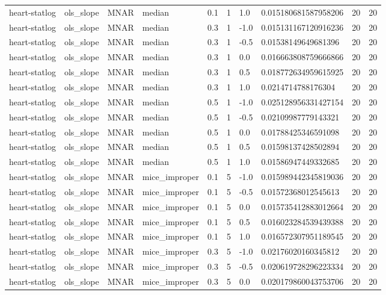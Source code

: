 \begin{tabular}{llllllllll}
heart-statlog & ols\_slope & MNAR & median & 0.1 & 1 & 1.0 & 0.015180681587958206 & 20 & 20 \\
heart-statlog & ols\_slope & MNAR & median & 0.3 & 1 & -1.0 & 0.015131167120916236 & 20 & 20 \\
heart-statlog & ols\_slope & MNAR & median & 0.3 & 1 & -0.5 & 0.01538149649681396 & 20 & 20 \\
heart-statlog & ols\_slope & MNAR & median & 0.3 & 1 & 0.0 & 0.016663808759666866 & 20 & 20 \\
heart-statlog & ols\_slope & MNAR & median & 0.3 & 1 & 0.5 & 0.018772634959615925 & 20 & 20 \\
heart-statlog & ols\_slope & MNAR & median & 0.3 & 1 & 1.0 & 0.0214714788176304 & 20 & 20 \\
heart-statlog & ols\_slope & MNAR & median & 0.5 & 1 & -1.0 & 0.025128956331427154 & 20 & 20 \\
heart-statlog & ols\_slope & MNAR & median & 0.5 & 1 & -0.5 & 0.02109987779143321 & 20 & 20 \\
heart-statlog & ols\_slope & MNAR & median & 0.5 & 1 & 0.0 & 0.01788425346591098 & 20 & 20 \\
heart-statlog & ols\_slope & MNAR & median & 0.5 & 1 & 0.5 & 0.01598137428502894 & 20 & 20 \\
heart-statlog & ols\_slope & MNAR & median & 0.5 & 1 & 1.0 & 0.01586947449332685 & 20 & 20 \\
heart-statlog & ols\_slope & MNAR & mice\_improper & 0.1 & 5 & -1.0 & 0.015989442345819036 & 20 & 20 \\
heart-statlog & ols\_slope & MNAR & mice\_improper & 0.1 & 5 & -0.5 & 0.01572368012545613 & 20 & 20 \\
heart-statlog & ols\_slope & MNAR & mice\_improper & 0.1 & 5 & 0.0 & 0.015735412883012664 & 20 & 20 \\
heart-statlog & ols\_slope & MNAR & mice\_improper & 0.1 & 5 & 0.5 & 0.016023284539439388 & 20 & 20 \\
heart-statlog & ols\_slope & MNAR & mice\_improper & 0.1 & 5 & 1.0 & 0.016572307951189545 & 20 & 20 \\
heart-statlog & ols\_slope & MNAR & mice\_improper & 0.3 & 5 & -1.0 & 0.02176020160345812 & 20 & 20 \\
heart-statlog & ols\_slope & MNAR & mice\_improper & 0.3 & 5 & -0.5 & 0.020619728296223334 & 20 & 20 \\
heart-statlog & ols\_slope & MNAR & mice\_improper & 0.3 & 5 & 0.0 & 0.020179860043753706 & 20 & 20 \\

\end{tabular}
